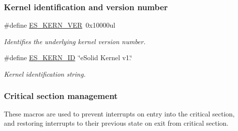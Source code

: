 \subsubsection*{Kernel identification and version number}
\begin{DoxyCompactItemize}
\item 
\#define \hyperlink{group__kern__intf_gacde22f7336a3c1c032dfc0ee3b94f506}{E\-S\-\_\-\-K\-E\-R\-N\-\_\-\-V\-E\-R}~0x10000ul
\begin{DoxyCompactList}\small\item\em Identifies the underlying kernel version number. \end{DoxyCompactList}\item 
\#define \hyperlink{group__kern__intf_ga7a9484c6b09349e4eb82ba67c0989e25}{E\-S\-\_\-\-K\-E\-R\-N\-\_\-\-I\-D}~\char`\"{}e\-Solid Kernel v1.\char`\"{}
\begin{DoxyCompactList}\small\item\em Kernel identification string. \end{DoxyCompactList}\end{DoxyCompactItemize}
\subsubsection*{Critical section management}
\label{_amgrp43784aebc31664bf2b83e85766997ec9}%
These macros are used to prevent interrupts on entry into the critical section, and restoring interrupts to their previous state on exit from critical section.

